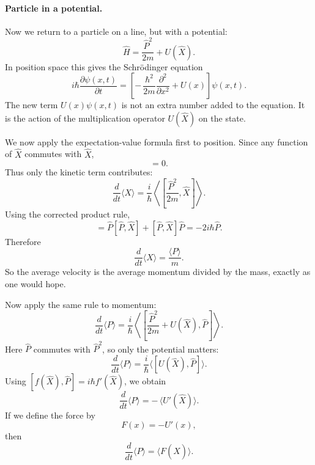 \paragraph{Particle in a potential.}
Now we return to a particle on a line, but with a potential:
\begin{equation}
\hat H = \frac{\hat P^2}{2m}+U(\hat X).
\end{equation}
In position space this gives the Schr\"odinger equation
\begin{equation}
i\hbar\frac{\partial \psi(x,t)}{\partial t}
=
\left[
-\,\frac{\hbar^2}{2m}\frac{\partial^2}{\partial x^2}
+
U(x)
\right]\psi(x,t).
\end{equation}
The new term \(U(x)\psi(x,t)\) is not an extra number added to the equation. It is the action of the multiplication operator \(U(\hat X)\) on the state.

We now apply the expectation-value formula first to position. Since any function of \(\hat X\) commutes with \(\hat X\),
\begin{equation}
[U(\hat X),\hat X]=0.
\end{equation}
Thus only the kinetic term contributes:
\begin{equation}
\frac{d}{dt}\langle X\rangle
=
\frac{i}{\hbar}
\left\langle
\left[
\frac{\hat P^2}{2m},\hat X
\right]
\right\rangle.
\end{equation}
Using the corrected product rule,
\begin{equation}
[\hat P^2,\hat X]
=
\hat P[\hat P,\hat X]+[\hat P,\hat X]\hat P
=
-2i\hbar \hat P.
\end{equation}
Therefore
\begin{equation}
\frac{d}{dt}\langle X\rangle
=
\frac{\langle P\rangle}{m}.
\end{equation}
So the average velocity is the average momentum divided by the mass, exactly as one would hope.

Now apply the same rule to momentum:
\begin{equation}
\frac{d}{dt}\langle P\rangle
=
\frac{i}{\hbar}
\left\langle
\left[
\frac{\hat P^2}{2m}+U(\hat X),\hat P
\right]
\right\rangle.
\end{equation}
Here \(\hat P\) commutes with \(\hat P^2\), so only the potential matters:
\begin{equation}
\frac{d}{dt}\langle P\rangle
=
\frac{i}{\hbar}\langle [U(\hat X),\hat P]\rangle.
\end{equation}
Using \([f(\hat X),\hat P]=i\hbar f'(\hat X)\), we obtain
\begin{equation}
\frac{d}{dt}\langle P\rangle
=
-\,\langle U'(\hat X)\rangle.
\end{equation}
If we define the force by
\begin{equation}
F(x)=-U'(x),
\end{equation}
then
\begin{equation}
\frac{d}{dt}\langle P\rangle = \langle F(\hat X)\rangle.
\end{equation}

